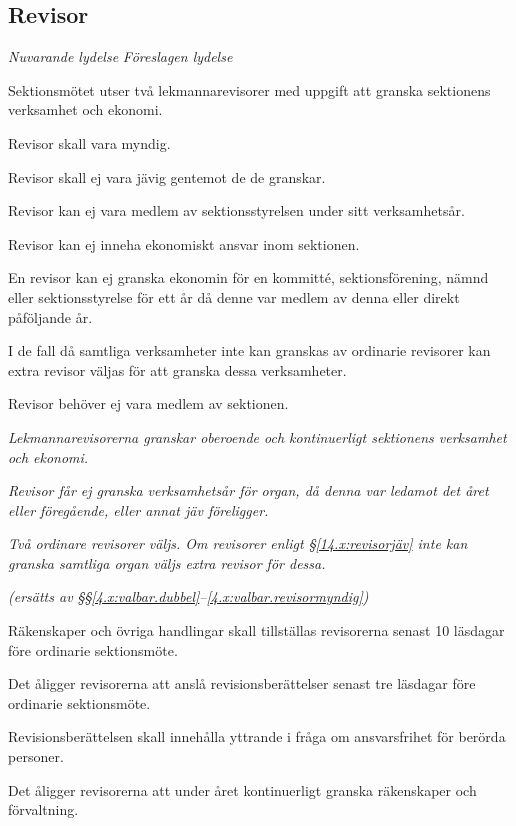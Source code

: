 \documentclass{article}
\newenvironment{lydelse}
    {\begin{paracol}{2}%
        \emph{Nuvarande lydelse}%
        \switchcolumn%
        \emph{Föreslagen lydelse}%
    \end{paracol}%
    \begin{enumerate}[label=\thesubsection.\arabic*]%
    \begin{paracol}{2}%
    }{\end{paracol}\end{enumerate}}
\begin{document}
\subsection{Revisor}
\begin{lydelse}
  \setcounter{section}{13}
  \setcounter{subsection}{1}
  \item Sektionsmötet utser två lekmannarevisorer med uppgift att granska sektionens verksamhet och ekonomi.
  \item Revisor skall vara myndig.
  \item Revisor skall ej vara jävig gentemot de de granskar.
  \item Revisor kan ej vara medlem av sektionsstyrelsen under sitt verksamhetsår.
  \item Revisor kan ej inneha ekonomiskt ansvar inom sektionen.
  \item En revisor kan ej granska ekonomin för en kommitté, sektionsförening, nämnd eller sektionsstyrelse för ett år då denne var medlem av denna eller direkt påföljande år.
  \item I de fall då samtliga verksamheter inte kan granskas av ordinarie revisorer kan extra revisor väljas för att granska dessa verksamheter.
  \item Revisor behöver ej vara medlem av sektionen.
 
  \switchcolumn
  \setcounter{enumi}{0}  
  \item \emph{Lekmannarevisorerna granskar oberoende och kontinuerligt sektionens verksamhet och ekonomi.}

  \item \emph{Revisor får ej granska verksamhetsår för organ, då denna var ledamot det året eller föregående, eller annat jäv föreligger.} \label{14.x:revisorjäv}

  \item \emph{Två ordinare revisorer väljs. Om revisorer enligt \S\ref{14.x:revisorjäv} inte kan granska samtliga organ väljs extra revisor för dessa.}

  \item[] \emph{(ersätts av \S\S\ref{4.x:valbar.dubbel}--\ref{4.x:valbar.revisormyndig})}

  \switchcolumn*
  \item Räkenskaper och övriga handlingar skall tillställas revisorerna senast 10 läsdagar före ordinarie sektionsmöte.
    \setcounter{subsection}{1}
    \setcounter{enumi}{0}  
  \item Det åligger revisorerna att anslå revisionsberättelser senast tre läsdagar före ordinarie sektionsmöte.
  \item Revisionsberättelsen skall innehålla yttrande i fråga om ansvarsfrihet för berörda personer.
  \item Det åligger revisorerna att under året kontinuerligt granska räkenskaper och förvaltning.
 

\end{lydelse}
\end{document}
